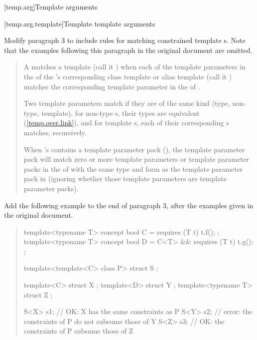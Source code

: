 [temp.arg]{Template arguments}

[temp.arg.template]{Template template arguments}

Modify paragraph 3 to include rules for matching constrained template 
s. Note that the 
examples following this paragraph in
the original document are omitted.

\begin{quote}
\setcounter{Paras}{2}
\pnum
A  matches 
a template  
(call it ) when each of the template parameters in 
the  of 
the 's 
corresponding class template or alias template (call it 
) matches the corresponding template parameter in 
the  of 
.

Two template parameters match if they are of the same kind 
(type, non-type, template), 
for non-type s,
their types are equivalent (\ref{temp.over.link}), and 
for template s, 
each of their corresponding 
s matches, recursively. 

When 's  
contains a template parameter pack 
(), the template parameter 
pack will match zero or more template parameters or template parameter 
packs in the  of 
 with the same type and form as the template parameter
pack in  (ignoring whether those template parameters are 
template parameter packs).
\end{quote}

Add the following example to the end of paragraph 3, after the
examples given in the original document.

\begin{quote}
\setcounter{Paras}{2}
\pnum
\enterexample
\begin{codeblock}
template<typename T> concept bool C = requires (T t) { t.f(); };
template<typename T> concept bool D = C<T> && requires (T t) { t.g(); };

template<template<C> class P>
  struct S { };

template<C> struct X { };
template<D> struct Y { };
template<typename T> struct Z { };

S<X> s1; // OK: X has the same constraints as P
S<Y> s2; // error: the constraints of P do not subsume those of Y
S<Z> s3; // OK: the constraints of P subsume those of Z
\end{codeblock}
\exitexample
\end{quote}      



